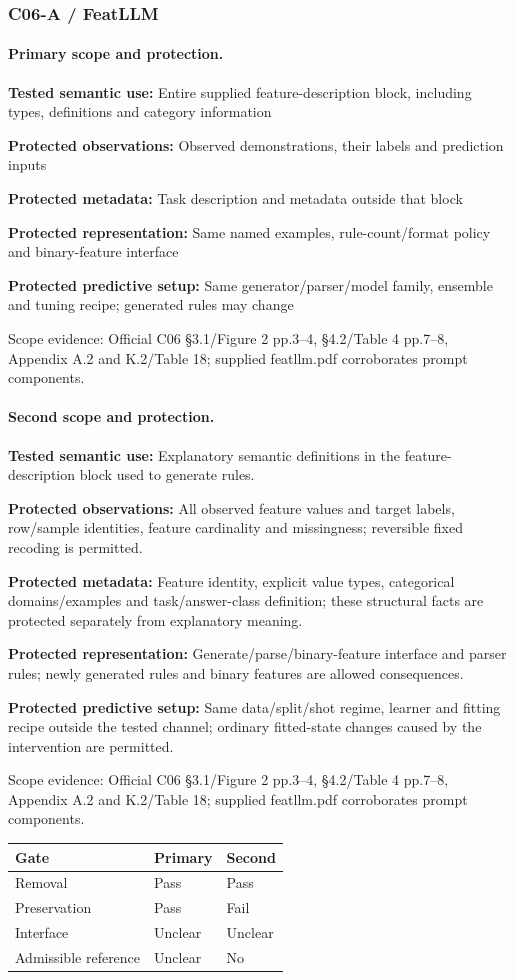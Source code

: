\documentclass[10pt]{article}
\begin{document}
\subsubsection*{C06-A / FeatLLM}
\paragraph{Primary scope and protection.}
\textbf{Tested semantic use:} Entire supplied feature-description block, including types, definitions and category information\par
\textbf{Protected observations:} Observed demonstrations, their labels and prediction inputs\par
\textbf{Protected metadata:} Task description and metadata outside that block\par
\textbf{Protected representation:} Same named examples, rule-count/format policy and binary-feature interface\par
\textbf{Protected predictive setup:} Same generator/parser/model family, ensemble and tuning recipe; generated rules may change\par
Scope evidence: Official C06 §3.1/Figure 2 pp.3--4, §4.2/Table 4 pp.7--8, Appendix A.2 and K.2/Table 18; supplied featllm.pdf corroborates prompt components.\par
\paragraph{Second scope and protection.}
\textbf{Tested semantic use:} Explanatory semantic definitions in the feature-description block used to generate rules.\par
\textbf{Protected observations:} All observed feature values and target labels, row/sample identities, feature cardinality and missingness; reversible fixed recoding is permitted.\par
\textbf{Protected metadata:} Feature identity, explicit value types, categorical domains/examples and task/answer-class definition; these structural facts are protected separately from explanatory meaning.\par
\textbf{Protected representation:} Generate/parse/binary-feature interface and parser rules; newly generated rules and binary features are allowed consequences.\par
\textbf{Protected predictive setup:} Same data/split/shot regime, learner and fitting recipe outside the tested channel; ordinary fitted-state changes caused by the intervention are permitted.\par
Scope evidence: Official C06 §3.1/Figure 2 pp.3--4, §4.2/Table 4 pp.7--8, Appendix A.2 and K.2/Table 18; supplied featllm.pdf corroborates prompt components.\par
\begin{tabular}{lll}\toprule Gate & Primary & Second \\ \midrule
Removal & Pass & Pass \\
Preservation & Pass & Fail \\
Interface & Unclear & Unclear \\
Admissible reference & Unclear & No \\
\bottomrule\end{tabular}
\end{document}
